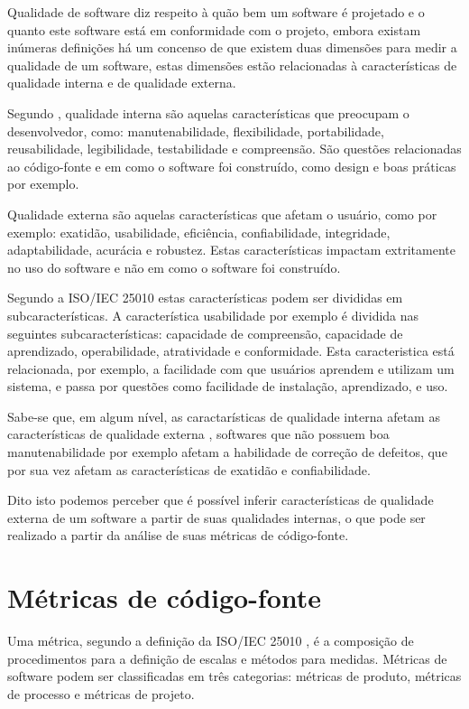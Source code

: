 \documentclass[qual, classic, a4paper]{ufbathesis}
\begin{document}
Qualidade de software diz respeito à quão bem um software é projetado e o
quanto este software está em conformidade com o projeto, embora existam
inúmeras definições há um concenso de que existem duas dimensões para medir a
qualidade de um software, estas dimensões estão relacionadas à características
de qualidade interna e de qualidade externa.

Segundo , qualidade interna são aquelas
características que preocupam o desenvolvedor, como: manutenabilidade,
flexibilidade, portabilidade, reusabilidade, legibilidade, testabilidade e
compreensão. São questões relacionadas ao código-fonte e em como o software
foi construído, como design e boas práticas por exemplo.

Qualidade externa são aquelas características que afetam o usuário, como por
exemplo: exatidão, usabilidade, eficiência, confiabilidade, integridade,
adaptabilidade, acurácia e robustez. Estas características impactam
extritamente no uso do software e não em como o software foi construído.

Segundo a ISO/IEC 25010 \cite{iso2011iec25010} estas características podem ser
divididas em subcaracterísticas. A característica usabilidade por exemplo é
dividida nas seguintes subcaracterísticas: capacidade de compreensão,
capacidade de aprendizado, operabilidade, atratividade e conformidade. Esta
caracteristica está relacionada, por exemplo, a facilidade com que usuários aprendem e
utilizam um sistema, e passa por questões como facilidade de instalação,
aprendizado, e uso.

Sabe-se que, em algum nível, as caractarísticas de qualidade interna afetam as
características de qualidade externa \cite{McConnell2004}, softwares que não
possuem boa manutenabilidade por exemplo afetam a habilidade de correção de
defeitos, que por sua vez afetam as características de exatidão e
confiabilidade.

Dito isto podemos perceber que é possível inferir características de qualidade
externa de um software a partir de suas qualidades internas, o que pode ser
realizado a partir da análise de suas métricas de código-fonte.

\section{Métricas de código-fonte}

Uma métrica, segundo a definição da ISO/IEC 25010 \cite{iso2011iec25010}, é a
composição de procedimentos para a definição de escalas e métodos para
medidas. Métricas de software podem ser classificadas em três categorias: métricas de
produto, métricas de processo e métricas de projeto.
\end{document}
